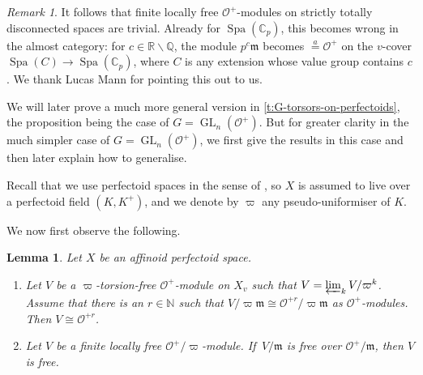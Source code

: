 \documentclass[10pt,a4paper]{article}
\newtheorem{Lemma}[thm]{Lemma}
\theoremstyle{definition}
\theoremstyle{remark}
\newtheorem{Remark}[thm]{Remark}
\newcommand{\C}{\mathbb{C}}
\newcommand{\N}{\mathbb{N}}
\renewcommand{\O}{\mathcal{O}}
\newcommand{\Q}{\mathbb{Q}}
\newcommand{\m}{\mathfrak{m}}
\newcommand{\GL}{\operatorname{GL}}
\newcommand{\Spa}{\operatorname{Spa}}
\newcommand{\aeq}{\stackrel{a}{=}}
\numberwithin{equation}{section}
\begin{document}
\begin{Remark}
 	It follows that finite locally free $\O^+$-modules on strictly totally disconnected spaces are trivial.
 	Already for $\Spa(\C_p)$, this becomes wrong in the almost category: for $c\in \mathbb R\backslash \Q$, the module $p^{c}\m$ becomes $\aeq \O^+$ on the $v$-cover $\Spa(C)\to \Spa(\C_p)$, where $C$ is any extension whose value group contains $c$.  We thank Lucas Mann for pointing this out to us.
\end{Remark}

We will later prove a much more general version in \cref{t:G-torsors-on-perfectoids}, the proposition being the case of $G=\GL_n(\O^+)$.  But for greater clarity in the much simpler case of $G=\GL_n(\O^+)$, we first give the results in this case and then later explain how to generalise.
 
 Recall that we use perfectoid spaces in the sense of \cite{perfectoid-spaces}, so $X$ is assumed to live over a perfectoid field $(K,K^+)$, and we denote by $\varpi$ any pseudo-uniformiser of $K$.
 
 We now first observe the following.


\begin{Lemma}\label{l:local-freeness--in-the-limit-in-the-v-topology}
	Let $X$ be an affinoid perfectoid space. 
	\begin{enumerate}
		\item\label{l:226-1} Let $V$ be a $\varpi$-torsion-free $\O^+$-module on $X_v$ such that $V=\varprojlim_k V/\varpi^k$. Assume that there is an $r\in \N$ such that $V/\varpi\m\cong \O^{+r}/\varpi\m$ as $\O^+$-modules. Then $V\cong \O^{+r}$. 
		\item\label{l:226-2} Let $V$ be a finite locally free $\O^+/\varpi$-module. If\, $V/\m$ is free over $\O^+/\m$, then $V$ is free.
	\end{enumerate}
\end{Lemma}
\end{document}
